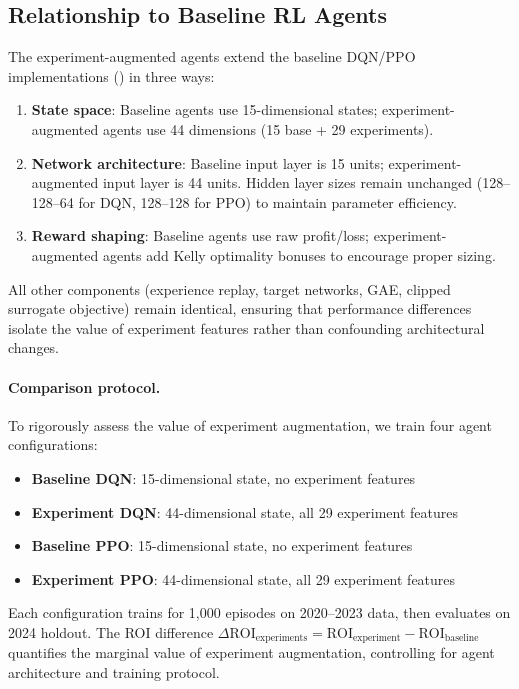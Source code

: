 \subsection{Relationship to Baseline RL Agents}

The experiment-augmented agents extend the baseline DQN/PPO implementations () in three ways:

\begin{enumerate}
  \item \textbf{State space}: Baseline agents use 15-dimensional states; experiment-augmented agents use 44 dimensions (15 base + 29 experiments).
  \item \textbf{Network architecture}: Baseline input layer is 15 units; experiment-augmented input layer is 44 units. Hidden layer sizes remain unchanged (128--128--64 for DQN, 128--128 for PPO) to maintain parameter efficiency.
  \item \textbf{Reward shaping}: Baseline agents use raw profit/loss; experiment-augmented agents add Kelly optimality bonuses to encourage proper sizing.
\end{enumerate}

All other components (experience replay, target networks, GAE, clipped surrogate objective) remain identical, ensuring that performance differences isolate the value of experiment features rather than confounding architectural changes.

\paragraph{Comparison protocol.}
To rigorously assess the value of experiment augmentation, we train four agent configurations:
\begin{itemize}
  \item \textbf{Baseline DQN}: 15-dimensional state, no experiment features
  \item \textbf{Experiment DQN}: 44-dimensional state, all 29 experiment features
  \item \textbf{Baseline PPO}: 15-dimensional state, no experiment features
  \item \textbf{Experiment PPO}: 44-dimensional state, all 29 experiment features
\end{itemize}

Each configuration trains for 1,000 episodes on 2020--2023 data, then evaluates on 2024 holdout. The ROI difference $\Delta \text{ROI}_{\text{experiments}} = \text{ROI}_{\text{experiment}} - \text{ROI}_{\text{baseline}}$ quantifies the marginal value of experiment augmentation, controlling for agent architecture and training protocol.


